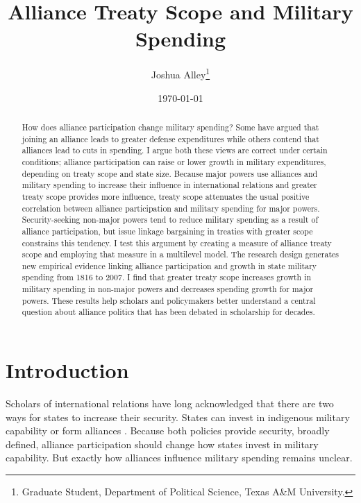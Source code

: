 \documentclass[12pt]{article}
\title{\textbf{Alliance Treaty Scope and Military Spending}}
\author{Joshua Alley\footnote{Graduate Student,
Department of Political Science, Texas A\&M University.}}
\date{{\normalsize \today}}
\begin{document}
\maketitle 

\newpage 

\doublespace 

\begin{abstract}
How does alliance participation change military spending? 
Some have argued that joining an alliance leads to greater defense expenditures while others contend that alliances lead to cuts in spending.
I argue both these views are correct under certain conditions; alliance participation can raise or lower growth in military expenditures, depending on treaty scope and state size. 
Because major powers use alliances and military spending to increase their influence in international relations and greater treaty scope provides more influence, treaty scope attenuates the usual positive correlation between alliance participation and military spending for major powers. 
Security-seeking non-major powers tend to reduce military spending as a result of alliance participation, but issue linkage bargaining in treaties with greater scope constrains this tendency. 
I test this argument by creating a measure of alliance treaty scope and employing that measure in a multilevel model. 
The research design generates new empirical evidence linking alliance participation and growth in state military spending from 1816 to 2007. 
I find that greater treaty scope increases growth in military spending in non-major powers and decreases spending growth for major powers.  
These results help scholars and policymakers better understand a central question about alliance politics that has been debated in scholarship for decades. 
\end{abstract}



\section{Introduction}


Scholars of international relations have long acknowledged that there are two ways for states to increase their security. 
States can invest in indigenous military capability or form alliances \citep{Morgenthau1948, Morrow1991}.
Because both policies provide security, broadly defined, alliance participation should change how states invest in military capability. 
But exactly how alliances influence military spending remains unclear. 
\end{document}

